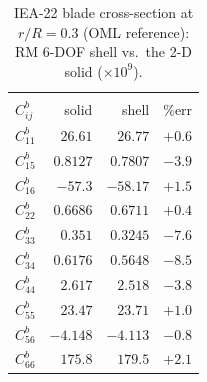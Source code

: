 \begin{table}[htpb]
\centering
\small
\caption{IEA-22 blade cross-section at $r/R=0.3$ (OML reference): RM 6-DOF shell vs.\ the 2-D solid ($\times10^{9}$).}
\label{tab:iea030}
\setlength{\tabcolsep}{4.5pt}
\begin{tabular}{l|rrr}
\hline
 & \multicolumn{3}{c}{} \\
$C^{b}_{ij}$ & solid & shell & \%err \\
\hline
$C^{b}_{11}$ & $26.61$ & $26.77$ & $+0.6$ \\
$C^{b}_{15}$ & $0.8127$ & $0.7807$ & $-3.9$ \\
$C^{b}_{16}$ & $-57.3$ & $-58.17$ & $+1.5$ \\
$C^{b}_{22}$ & $0.6686$ & $0.6711$ & $+0.4$ \\
$C^{b}_{33}$ & $0.351$ & $0.3245$ & $-7.6$ \\
$C^{b}_{34}$ & $0.6176$ & $0.5648$ & $-8.5$ \\
$C^{b}_{44}$ & $2.617$ & $2.518$ & $-3.8$ \\
$C^{b}_{55}$ & $23.47$ & $23.71$ & $+1.0$ \\
$C^{b}_{56}$ & $-4.148$ & $-4.113$ & $-0.8$ \\
$C^{b}_{66}$ & $175.8$ & $179.5$ & $+2.1$ \\
\hline
\end{tabular}
\end{table}